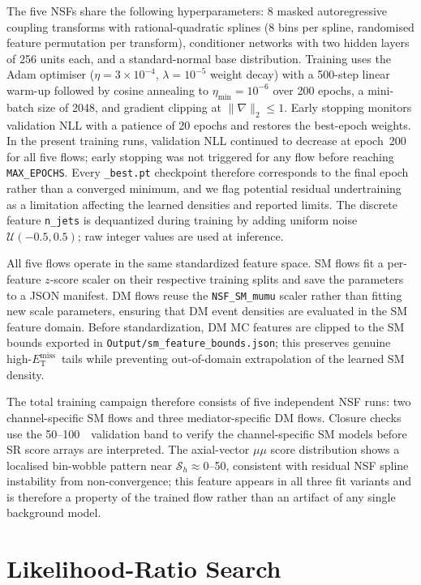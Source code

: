 \documentclass[11pt,a4paper,twocolumn]{article}
\newcommand{\GeV}{\text{GeV}}
\newcommand{\MET}{\ensuremath{E_{\mathrm{T}}^{\mathrm{miss}}}}
\begin{document}
The five NSFs share the following hyperparameters: 8 masked autoregressive coupling
transforms with rational-quadratic splines (8 bins per spline, randomised feature
permutation per transform), conditioner networks with two hidden layers of 256 units each,
and a standard-normal base distribution.
Training uses the Adam optimiser ($\eta=3\times10^{-4}$, $\lambda=10^{-5}$ weight decay)
with a 500-step linear warm-up followed by cosine annealing to
$\eta_\mathrm{min}=10^{-6}$ over 200 epochs, a mini-batch size of 2048, and gradient
clipping at $\|\nabla\|_2\le 1$.
Early stopping monitors validation NLL with a patience of 20 epochs and restores the
best-epoch weights.
In the present training runs, validation NLL continued to decrease at
epoch~200 for all five flows; early stopping was not triggered for any
flow before reaching \texttt{MAX\_EPOCHS}. Every \texttt{\_best.pt}
checkpoint therefore corresponds to the final epoch rather than a
converged minimum, and we flag potential residual undertraining as a
limitation affecting the learned densities and reported limits.
The discrete feature \texttt{n\_jets} is dequantized during training by adding uniform
noise $\mathcal{U}(-0.5,0.5)$; raw integer values are used at inference.

All five flows operate in the same standardized feature space.
SM flows fit a per-feature $z$-score scaler on their respective training splits and save
the parameters to a JSON manifest.
DM flows reuse the \texttt{NSF\_SM\_mumu} scaler rather than fitting new scale parameters,
ensuring that DM event densities are evaluated in the SM feature domain.
Before standardization, DM MC features are clipped to the SM bounds exported in
\texttt{Output/sm\_feature\_bounds.json}; this preserves genuine high-\MET\ tails while
preventing out-of-domain extrapolation of the learned SM density.

The total training campaign therefore consists of five independent NSF runs: two
channel-specific SM flows and three mediator-specific DM flows.
Closure checks use the 50--100~\GeV\ validation band to verify the channel-specific SM
models before SR score arrays are interpreted.
The axial-vector $\mu\mu$ score distribution shows a localised bin-wobble
pattern near $\mathcal{S}_h\approx0$--50, consistent with residual NSF
spline instability from non-convergence; this feature appears in all three
fit variants and is therefore a property of the trained flow rather than an
artifact of any single background model.

\section{Likelihood-Ratio Search}
\label{sec:search}
\end{document}
